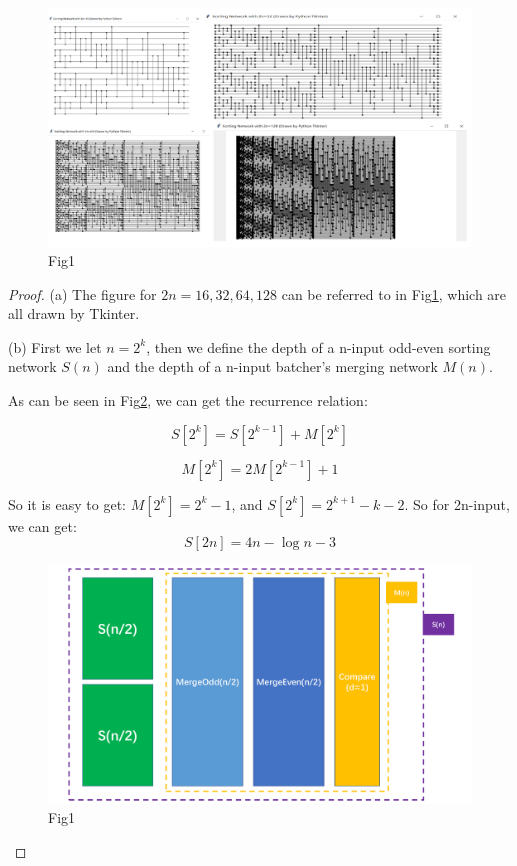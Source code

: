 \documentclass[12pt,a4paper]{article}
\theoremstyle{definition}
\begin{document}
\begin{enumerate}
	\begin{figure}
		\centering
		 \includegraphics[scale=0.6]{batcher.pdf}
		 \caption{Fig1}
		 \label{fig1}
	\end{figure}
	\begin{proof}
	(a) The figure for $2n = 16, 32, 64, 128$ can be referred to in Fig\ref{fig1}, which are all drawn by Tkinter.
	
	(b) First we let $n = 2^k$, then we define the depth of a n-input odd-even sorting network $S(n)$ and the depth of a n-input 
	batcher's merging network $M(n)$.

	As can be seen in Fig\ref{fig2}, we can get the recurrence relation:
	
	\begin{equation*}
		S[2^k] = S[2^{k - 1}] + M[2^k]
	\end{equation*}

	\begin{equation*}
	 M[2^k] = 2M[2^{k - 1}] + 1
	\end{equation*}

	So it is easy to get: $M[2^k] = 2^k - 1$, and $S[2^k] = 2^{k + 1} - k - 2$. So for 2n-input, we can get:
	\begin{equation*}
		S[2n] = 4n - \log n - 3
	\end{equation*}
   
	\begin{figure}
		\centering
		 \includegraphics[scale=0.55]{Struct.pdf}
		 \caption{Fig1}
		 \label{fig2}
	\end{figure}


\end{proof}
\end{enumerate}
\end{document}

